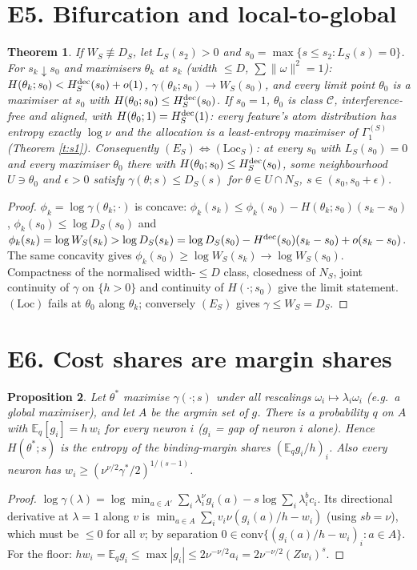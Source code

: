 \documentclass[11pt]{article}
\newtheorem{theorem}{Theorem}\newtheorem{lemma}[theorem]{Lemma}\newtheorem{proposition}[theorem]{Proposition}
\theoremstyle{remark}\newtheorem{remark}[theorem]{Remark}
\begin{document}
\section{E5. Bifurcation and local-to-global}
\begin{theorem}\label{t:bif}
If $W_S\not\equiv D_S$, let $L_S(s_2)>0$ and $s_0=\max\{s\le s_2:L_S(s)=0\}$. For $s_k\downarrow s_0$ and maximisers $\theta_k$ at $s_k$ (width $\le D$,
$\sum\|\omega\|^2=1$): $H(\theta_k;s_0)<H^{\rm dec}_S(s_0)+o(1)$, $\gamma(\theta_k;s_0)\to W_S(s_0)$, and every limit point $\theta_0$ is a maximiser at $s_0$ with
$H(\theta_0;s_0)\le H^{\rm dec}_S(s_0)$. If $s_0=1$, $\theta_0$ is class $\mathcal C$, interference-free and aligned, with $H(\theta_0;1)=H^{\rm dec}_S(1)$: every feature's atom distribution has entropy exactly $\log\nu$ and the allocation is a least-entropy maximiser of $\Gamma^{(S)}_1$ (Theorem \ref{t:s1}).
Consequently $(E_S)\iff(\mathrm{Loc}_S)$: at every $s_0$ with $L_S(s_0)=0$ and every maximiser $\theta_0$ there with $H(\theta_0;s_0)\le H^{\rm dec}_S(s_0)$,
some neighbourhood $U\ni\theta_0$ and $\epsilon>0$ satisfy $\gamma(\theta;s)\le D_S(s)$ for $\theta\in U\cap N_S$, $s\in(s_0,s_0+\epsilon)$.
\end{theorem}
\begin{proof}
$\phi_k=\log\gamma(\theta_k;\cdot)$ is concave: $\phi_k(s_k)\le\phi_k(s_0)-H(\theta_k;s_0)(s_k-s_0)$, $\phi_k(s_0)\le\log D_S(s_0)$ and
$\phi_k(s_k)=\log W_S(s_k)>\log D_S(s_k)=\log D_S(s_0)-H^{\rm dec}(s_0)(s_k-s_0)+o(s_k-s_0)$. The same concavity gives
$\phi_k(s_0)\ge\log W_S(s_k)\to\log W_S(s_0)$. Compactness of the normalised width-$\le D$ class, closedness of $N_S$, joint continuity of $\gamma$
on $\{h>0\}$ and continuity of $H(\cdot;s_0)$ give the limit statement. $(\mathrm{Loc})$ fails at $\theta_0$ along $\theta_k$; conversely $(E_S)$ gives $\gamma\le W_S=D_S$.
\end{proof}

\section{E6. Cost shares are margin shares}
\begin{proposition}\label{p:kkt}
Let $\theta^*$ maximise $\gamma(\cdot;s)$ under all rescalings $\omega_i\mapsto\lambda_i\omega_i$ (e.g.\ a global maximiser), and let $A$ be the argmin set of
$g$. There is a probability $q$ on $A$ with $\mathbb E_q[g_i]=h\,w_i$ for every neuron $i$ ($g_i$ = gap of neuron $i$ alone). Hence
$H(\theta^*;s)$ is the entropy of the binding-margin shares $(\mathbb E_qg_i/h)_i$. Also every neuron has $w_i\ge(\nu^{\nu/2}\gamma^*/2)^{1/(s-1)}$.
\end{proposition}
\begin{proof}
$\log\gamma(\lambda)=\log\min_{a\in A'}\sum_i\lambda_i^\nu g_i(a)-s\log\sum_i\lambda_i^bc_i$. Its directional derivative at $\lambda=1$ along $v$ is
$\min_{a\in A}\sum_iv_i\nu(g_i(a)/h-w_i)$ (using $sb=\nu$), which must be $\le0$ for all $v$; by separation $0\in\mathrm{conv}\{(g_i(a)/h-w_i)_i:a\in A\}$.
For the floor: $hw_i=\mathbb E_qg_i\le\max|g_i|\le2\nu^{-\nu/2}a_i=2\nu^{-\nu/2}(Zw_i)^s$.
\end{proof}
\end{document}
